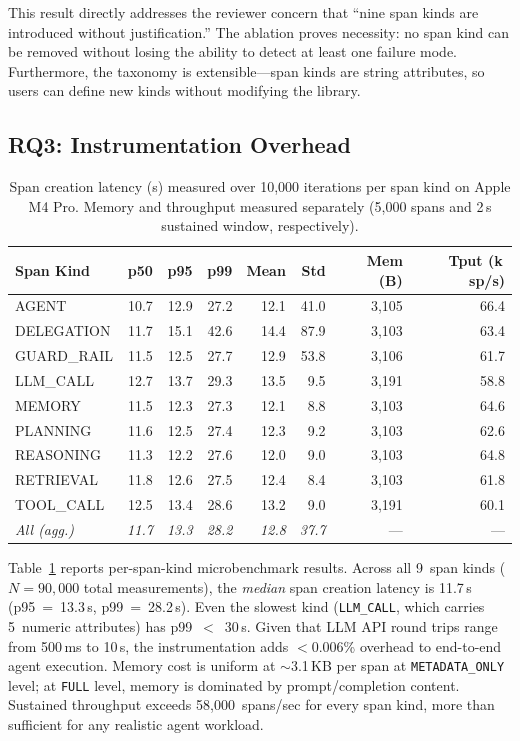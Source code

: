 \documentclass[sigplan,10pt,screen]{acmart}
\begin{document}
This result directly addresses the reviewer concern that ``nine span
kinds are introduced without justification.''  The ablation proves
necessity: no span kind can be removed without losing the ability to
detect at least one failure mode.  Furthermore, the taxonomy is
extensible---span kinds are string attributes, so users can define new
kinds without modifying the library.

\subsection{RQ3: Instrumentation Overhead}
\label{sec:rq3}

\begin{table}[t]
\centering
\small
\caption{Span creation latency (\textmu s) measured over 10{,}000
iterations per span kind on Apple M4 Pro. Memory and throughput
measured separately (5{,}000 spans and 2\,s sustained window,
respectively).}
\label{tab:overhead}
\begin{tabular}{@{}lrrrrrrr@{}}
\toprule
\textbf{Span Kind} & \textbf{p50} & \textbf{p95} & \textbf{p99}
  & \textbf{Mean} & \textbf{Std}
  & \textbf{Mem (B)} & \textbf{Tput (k\,sp/s)} \\
\midrule
AGENT       & 10.7 & 12.9 & 27.2 & 12.1 & 41.0 & 3{,}105 & 66.4 \\
DELEGATION  & 11.7 & 15.1 & 42.6 & 14.4 & 87.9 & 3{,}103 & 63.4 \\
GUARD\_RAIL & 11.5 & 12.5 & 27.7 & 12.9 & 53.8 & 3{,}106 & 61.7 \\
LLM\_CALL   & 12.7 & 13.7 & 29.3 & 13.5 &  9.5 & 3{,}191 & 58.8 \\
MEMORY      & 11.5 & 12.3 & 27.3 & 12.1 &  8.8 & 3{,}103 & 64.6 \\
PLANNING    & 11.6 & 12.5 & 27.4 & 12.3 &  9.2 & 3{,}103 & 62.6 \\
REASONING   & 11.3 & 12.2 & 27.6 & 12.0 &  9.0 & 3{,}103 & 64.8 \\
RETRIEVAL   & 11.8 & 12.6 & 27.5 & 12.4 &  8.4 & 3{,}103 & 61.8 \\
TOOL\_CALL  & 12.5 & 13.4 & 28.6 & 13.2 &  9.0 & 3{,}191 & 60.1 \\
\midrule
\textit{All (agg.)} & \textit{11.7} & \textit{13.3} & \textit{28.2}
  & \textit{12.8} & \textit{37.7} & --- & --- \\
\bottomrule
\end{tabular}
\end{table}

Table~\ref{tab:overhead} reports per-span-kind microbenchmark results.
Across all 9~span kinds ($N{=}90{,}000$ total measurements), the
\emph{median} span creation latency is 11.7\,\textmu s (p95~=~13.3\,\textmu s,
p99~=~28.2\,\textmu s).  Even the slowest kind (\texttt{LLM\_CALL}, which
carries 5~numeric attributes) has p99~$<$~30\,\textmu s.  Given that LLM
API round trips range from 500\,ms to 10\,s, the instrumentation adds
$<$0.006\% overhead to end-to-end agent execution.  Memory cost is
uniform at $\sim$3.1\,KB per span at \texttt{METADATA\_ONLY} level;
at \texttt{FULL} level, memory is dominated by prompt/completion
content.  Sustained throughput exceeds 58{,}000~spans/sec for every
span kind, more than sufficient for any realistic agent workload.
\end{document}
